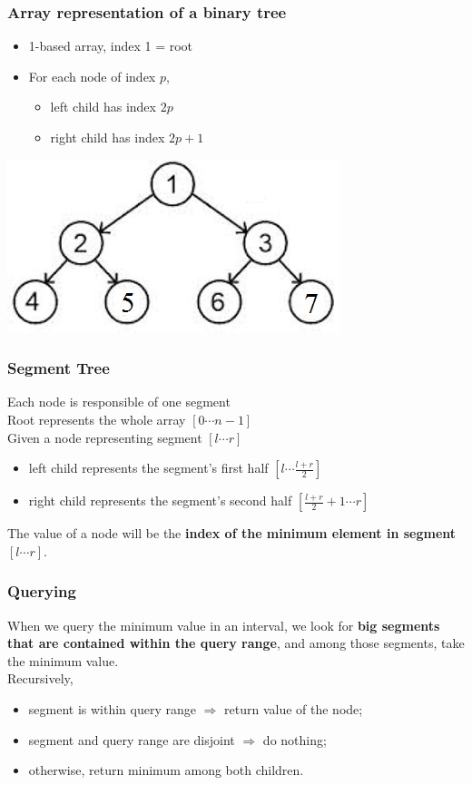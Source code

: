 \documentclass[12pt]{beamer}
\begin{document}
\begin{frame}
    \frametitle{Array representation of a binary tree}
    \begin{itemize}
        \item 1-based array, index 1 = root
        \item For each node of index $p$,
        \begin{itemize}
            \item left child has index $2p$
            \item right child has index $2p+1$
        \end{itemize}
    \end{itemize}
    \begin{center}
        \includegraphics[width=.5\textwidth]{img/compact-array.jpg}
    \end{center}
\end{frame}

\begin{frame}
    \frametitle{Segment Tree}
    Each node is responsible of one segment \\
    Root represents the whole array $[0\cdots n-1]$ \\
    Given a node representing segment $[l\cdots r]$ 
    \begin{itemize}
        \item left child represents the segment's first half $\left[ l \cdots \frac{l+r}{2} \right]$
        \item right child represents the segment's second half $\left[ \frac{l+r}{2}+1\cdots r \right]$
    \end{itemize}
    The value of a node will be the \textbf{index of the minimum element in segment $\left[ l\cdots r \right]$}.

\end{frame}

\begin{frame}
    \frametitle{Querying}
    When we query the minimum value in an interval, we look for \textbf{big segments that are contained within the query range}, and among those segments, take the minimum value. \\
    Recursively,
    \begin{itemize}
        \item segment is within query range $\Rightarrow$ return value of the node;
        \item segment and query range are disjoint $\Rightarrow$ do nothing;
        \item otherwise, return minimum among both children.
    \end{itemize}
\end{frame}
\end{document}
